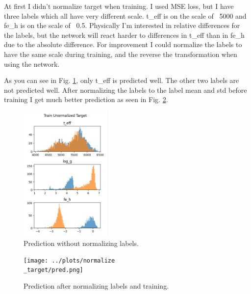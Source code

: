 \documentclass[12pt, a4paper]{article}
\begin{document}
At first I didn't normalize target when training. I used MSE loss, but I have three labels which all have very different scale.
t\_eff is on the scale of ~5000 and fe\_h is on the scale of ~0.5.
Physically I'm interested in relative differences for the labels, but the network will react harder to 
differences in t\_eff than in fe\_h due to the absolute difference. For improvement I could
normalize the labels to have the same scale during training, and the reverse the transformation when using the network.

As you can see in Fig. \ref{fig:pred}, only t\_eff is predicted well. The other two labels are not predicted well.
After normalizing the labels to the label mean and std before training I get much better prediction as seen in Fig. \ref{fig:pred_norm}.

\begin{figure}[!h]
    \centering
    \includegraphics[width=0.4\textwidth]{../plots/pred.png}
    \caption{Prediction without normalizing labels.}
    \label{fig:pred}
\end{figure}

\begin{figure}[!h]
    \centering
    \texttt{[image: ../plots/normalize\\\_target/pred.png]}
    \caption{Prediction after normalizing labels and training.}
    \label{fig:pred_norm}
\end{figure}
\end{document}
